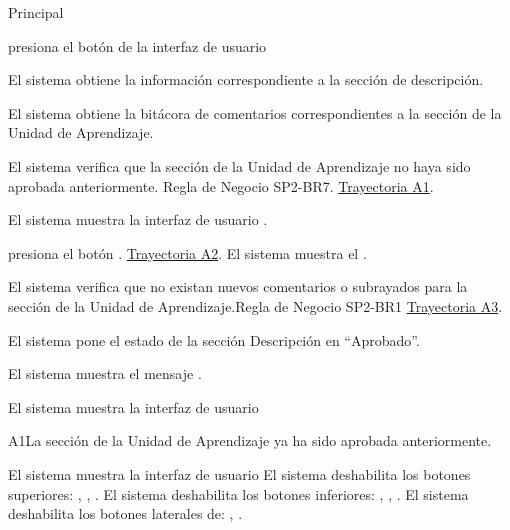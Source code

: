 \begin{UCtrayectoria}{Principal}

    \UCpaso[\UCactor] presiona el botón   de la interfaz de usuario 

    \UCpaso El sistema obtiene la información correspondiente a la sección de descripción.
    
    \UCpaso El sistema obtiene la bitácora de comentarios correspondientes a la sección de la Unidad de Aprendizaje. 
    
    \UCpaso El sistema verifica que la sección de la Unidad de Aprendizaje no haya sido aprobada anteriormente. Regla de Negocio SP2-BR7. \hyperref[SP2-CU7-A1]{Trayectoria A1}. 
    
    \UCpaso El sistema muestra la interfaz de usuario  .
    
    \UCpaso[\UCactor] presiona el botón . \hyperref[SP2-CU7-A2]{Trayectoria A2}.
    \UCpaso El sistema muestra el .
    
    \UCpaso	El sistema verifica que no existan nuevos comentarios o subrayados para la sección de la Unidad de Aprendizaje.Regla de Negocio  SP2-BR1 \hyperref[SP2-CU7-A3]{Trayectoria A3}. 
    
    \UCpaso El sistema pone el estado de la sección Descripción  en “Aprobado”.
    
    \UCpaso El sistema muestra el mensaje .

    \UCpaso El sistema muestra la interfaz de usuario 

\end{UCtrayectoria}

\label{SP2-CU7-A1}
\begin{UCtrayectoriaA}{A1}{La sección de la Unidad de Aprendizaje ya ha sido aprobada anteriormente.}

	\UCpaso El sistema muestra la interfaz de usuario  
    \UCpaso El sistema deshabilita los botones superiores: , , .
    \UCpaso El sistema deshabilita los botones inferiores: , , .
    \UCpaso El sistema deshabilita los botones laterales de: , .
\end{UCtrayectoriaA}

